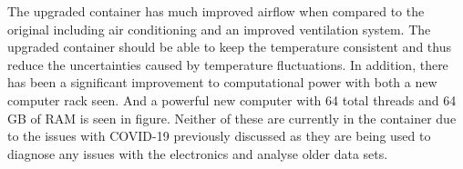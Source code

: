 The upgraded container has much improved airflow when compared to the original including air conditioning and an improved ventilation system. The upgraded container should be able to keep the temperature consistent and thus reduce the uncertainties caused by temperature fluctuations. In addition, there has been a significant improvement to computational power with both a new computer rack seen. And a powerful new computer with 64 total threads and 64\,GB of RAM is seen in figure. Neither of these are currently in the container due to the issues with COVID-19 previously discussed as they are being used to diagnose any issues with the electronics and analyse older data sets.  






